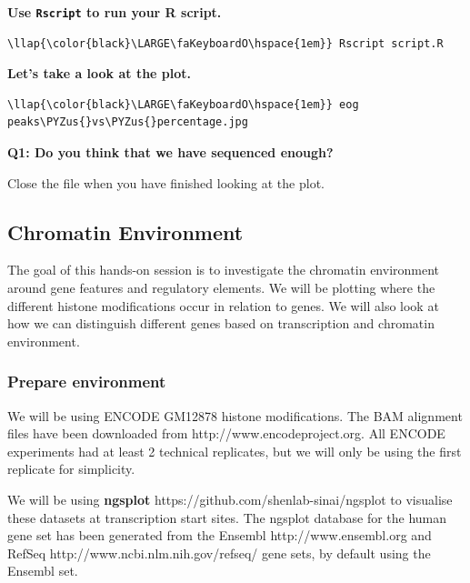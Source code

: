 \documentclass[11pt]{article}
\def\PYZus{\char`\_}
\begin{document}
    \textbf{Use \texttt{Rscript} to run your R script.}

\begin{terminalinput}
\begin{Verbatim}[commandchars=\\\{\}]
\llap{\color{black}\LARGE\faKeyboardO\hspace{1em}} Rscript script.R
\end{Verbatim}
\end{terminalinput}


    \textbf{Let's take a look at the plot.}

\begin{terminalinput}
\begin{Verbatim}[commandchars=\\\{\}]
\llap{\color{black}\LARGE\faKeyboardO\hspace{1em}} eog peaks\PYZus{}vs\PYZus{}percentage.jpg
\end{Verbatim}
\end{terminalinput}


    \textbf{Q1: Do you think that we have sequenced enough?}

    Close the file when you have finished looking at the plot.

\newpage

    \subsection{Chromatin Environment}\label{chromatin-environment}

    The goal of this hands-on session is to investigate the chromatin
environment around gene features and regulatory elements. We will be
plotting where the different histone modifications occur in relation to
genes. We will also look at how we can distinguish different genes based
on transcription and chromatin environment.

    \subsubsection{Prepare environment}\label{prepare-environment}

    We will be using ENCODE GM12878 histone modifications. The BAM alignment
files have been downloaded from http://www.encodeproject.org. All ENCODE
experiments had at least 2 technical replicates, but we will only be
using the first replicate for simplicity.

We will be using \textbf{ngsplot}
https://github.com/shenlab-sinai/ngsplot to visualise these datasets at
transcription start sites. The ngsplot database for the human gene set
has been generated from the Ensembl http://www.ensembl.org and RefSeq
http://www.ncbi.nlm.nih.gov/refseq/ gene sets, by default using the
Ensembl set.
\end{document}
